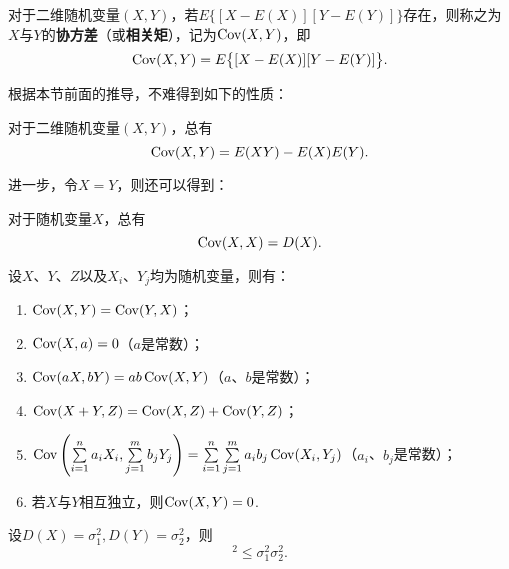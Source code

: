 \begin{definition}
对于二维随机变量\((X,Y)\)，若\(E\bigl\{[X-E(X)][Y-E(Y)]\bigr\}\)存在，则称之为\(X\)与\(Y\)的\textbf{协方差}（或\textbf{相关矩}），记为\(\operatorname{Cov}(X,Y)\)，即
\begin{equation}\label{equation:随机变量的数字特征.协方差的定义式}
\operatorname{Cov}(X,Y) = E\bigl\{[X-E(X)][Y-E(Y)]\bigr\}.
\end{equation}
\end{definition}

根据本节前面的推导，不难得到如下的性质：
\begin{property}\label{theorem:随机变量的数字特征.协方差的性质1}
对于二维随机变量\((X,Y)\)，总有\begin{equation}\label{equation:随机变量的数字特征.协方差的计算式1}
\operatorname{Cov}(X,Y) = E(XY) - E(X) E(Y).
\end{equation}
\end{property}

进一步，令\(X = Y\)，则还可以得到：
\begin{property}\label{theorem:随机变量的数字特征.协方差的性质2}
对于随机变量\(X\)，总有\begin{equation}\label{equation:随机变量的数字特征.协方差与方差的联系1}
\operatorname{Cov}(X,X) = D(X).
\end{equation}
\end{property}

\begin{property}\label{theorem:随机变量的数字特征.协方差的性质3}
设\(X\)、\(Y\)、\(Z\)以及\(X_i\)、\(Y_j\)均为随机变量，则有：
\begin{enumerate}
\item \(\operatorname{Cov}(X,Y)=\operatorname{Cov}(Y,X)\)；
\item \(\operatorname{Cov}(X,a)=0\)（\(a\)是常数）；
\item \(\operatorname{Cov}(aX,bY)=ab\operatorname{Cov}(X,Y)\)（\(a\)、\(b\)是常数）；
\item \(\operatorname{Cov}(X+Y,Z)=\operatorname{Cov}(X,Z)+\operatorname{Cov}(Y,Z)\)；
\item \(\operatorname{Cov}\left(\sum\limits_{i=1}^n{a_i X_i},\sum\limits_{j=1}^m{b_j Y_j}\right)
= \sum\limits_{i=1}^n \sum\limits_{j=1}^m {a_i b_j \operatorname{Cov}(X_i,Y_j)}\)（\(a_i\)、\(b_j\)是常数）；
\item 若\(X\)与\(Y\)相互独立，则\(\operatorname{Cov}(X,Y)=0\).
\end{enumerate}
\end{property}

\begin{theorem}
设\(D(X) = \sigma_1^2, D(Y) = \sigma_2^2\)，则\begin{equation}
[\Cov(X,Y)]^2 \leqslant \sigma_1^2 \sigma_2^2.
\end{equation}
\end{theorem}

